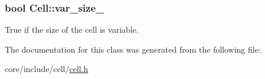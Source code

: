 \subsubsection[{var\+\_\+size\+\_\+}]{\setlength{\rightskip}{0pt plus 5cm}bool Cell\+::var\+\_\+size\+\_\+\hspace{0.3cm}{\ttfamily [private]}}\label{classCell_a83cd3e9053931b72bf5a783d3104a20f}
True if the size of the cell is variable. 

The documentation for this class was generated from the following file\+:\begin{DoxyCompactItemize}
\item 
core/include/cell/\hyperlink{cell_8h}{cell.\+h}\end{DoxyCompactItemize}

